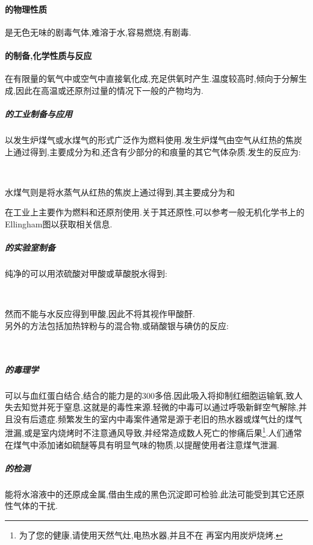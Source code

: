 \documentclass{ctexart}
\begin{document}
\paragraph{的物理性质}
是无色无味的剧毒气体,难溶于水,容易燃烧,有剧毒.
\paragraph{的制备,化学性质与反应}
在有限量的氧气中或空气中直接氧化成,充足供氧时产生.温度较高时,倾向于分解生成,因此在高温或还原剂过量的情况下一般的产物均为.
\subparagraph{的工业制备与应用}
以发生炉煤气或水煤气的形式广泛作为燃料使用.发生炉煤气由空气从红热的焦炭上通过得到,主要成分为和,还含有少部分的和痕量的其它气体杂质.发生的反应为:
\begin{center}
    \\
\end{center}
水煤气则是将水蒸气从红热的焦炭上通过得到,其主要成分为和
\begin{center}
\end{center}
在工业上主要作为燃料和还原剂使用.关于其还原性,可以参考一般无机化学书上的Ellingham图以获取相关信息.
\subparagraph{的实验室制备}
\indent 纯净的可以用浓硫酸对甲酸或草酸脱水得到:
\begin{center}
    \\
\end{center}
然而不能与水反应得到甲酸,因此不将其视作甲酸酐.\\
\indent 另外的方法包括加热锌粉与的混合物,或硝酸银与碘仿的反应:
\begin{center}
    \\
\end{center}
\subparagraph{的毒理学}
可以与血红蛋白结合,结合的能力是的$300$多倍,因此吸入将抑制红细胞运输氧,致人失去知觉并死于窒息,这就是的毒性来源.轻微的中毒可以通过呼吸新鲜空气解除,并且没有后遗症.频繁发生的室内中毒案件通常是源于老旧的热水器或煤气灶的煤气泄漏,或是室内烧烤时不注意通风导致,并经常造成数人死亡的惨痛后果\footnote{为了您的健康,请使用天然气灶,电热水器,并且不在
再室内用炭炉烧烤.}.人们通常在煤气中添加诸如硫醚等具有明显气味的物质,以提醒使用者注意煤气泄漏.
\subparagraph{的检测}
能将水溶液中的还原成金属,借由生成的黑色沉淀即可检验.此法可能受到其它还原性气体的干扰.
\end{document}
